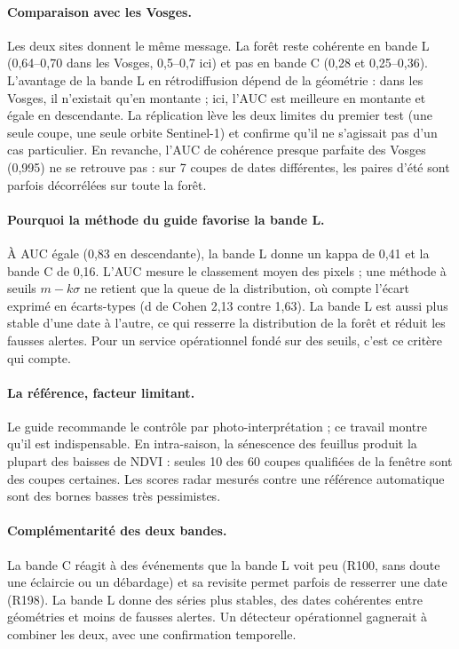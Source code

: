 \paragraph{Comparaison avec les Vosges.} Les deux sites donnent le même message. La forêt reste cohérente
en bande L (0,64--0,70 dans les Vosges, 0,5--0,7 ici) et pas en bande C (0,28 et 0,25--0,36). L'avantage de
la bande L en rétrodiffusion dépend de la géométrie : dans les Vosges, il n'existait qu'en montante ; ici,
l'AUC est meilleure en montante et égale en descendante. La réplication lève les deux limites du premier
test (une seule coupe, une seule orbite Sentinel-1) et confirme qu'il ne s'agissait pas d'un cas
particulier. En revanche, l'AUC de cohérence presque parfaite des Vosges (0,995) ne se retrouve pas : sur
7 coupes de dates différentes, les paires d'été sont parfois décorrélées sur toute la forêt.

\paragraph{Pourquoi la méthode du guide favorise la bande L.} À AUC égale (0,83 en descendante), la bande L
donne un kappa de 0,41 et la bande C de 0,16. L'AUC mesure le classement moyen des pixels ; une méthode à
seuils $m-k\sigma$ ne retient que la queue de la distribution, où compte l'écart exprimé en écarts-types
(d de Cohen 2,13 contre 1,63). La bande L est aussi plus stable d'une date à l'autre, ce qui resserre la
distribution de la forêt et réduit les fausses alertes. Pour un service opérationnel fondé sur des seuils,
c'est ce critère qui compte.

\paragraph{La référence, facteur limitant.} Le guide recommande le contrôle par photo-interprétation ; ce
travail montre qu'il est indispensable. En intra-saison, la sénescence des feuillus produit la plupart des
baisses de NDVI : seules 10 des 60 coupes qualifiées de la fenêtre sont des coupes certaines. Les scores
radar mesurés contre une référence automatique sont des bornes basses très pessimistes.

\paragraph{Complémentarité des deux bandes.} La bande C réagit à des événements que la bande L voit peu
(R100, sans doute une éclaircie ou un débardage) et sa revisite permet parfois de resserrer une date
(R198). La bande L donne des séries plus stables, des dates cohérentes entre géométries et moins de fausses
alertes. Un détecteur opérationnel gagnerait à combiner les deux, avec une confirmation temporelle.

